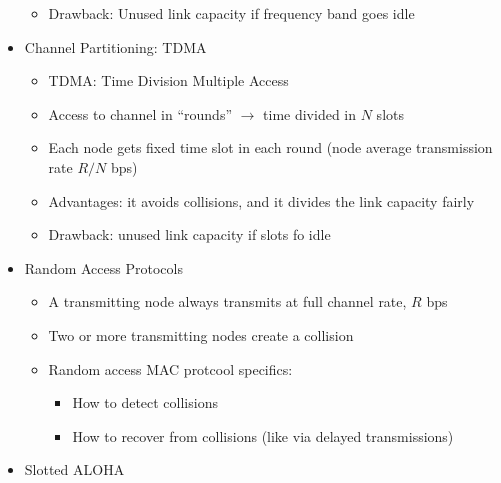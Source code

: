 \begin{itemize}
\begin{itemize}
      \item Drawback: Unused link capacity if frequency band goes idle

    \end{itemize}

  \item Channel Partitioning: TDMA

    \begin{itemize}

      \item TDMA: Time Division Multiple Access

      \item Access to channel in ``rounds'' $\to$ time divided in $N$ slots

      \item Each node gets fixed time slot in each round (node average transmission rate $R/N$ bps)

      \item Advantages: it avoids collisions, and it divides the link capacity fairly

      \item Drawback: unused link capacity if slots fo idle

    \end{itemize}

  \item Random Access Protocols

    \begin{itemize}

      \item A transmitting node always transmits at full channel rate, $R$ bps

      \item Two or more transmitting nodes create a collision

      \item Random access MAC protcool specifics:

        \begin{itemize}

          \item How to detect collisions

          \item How to recover from collisions (like via delayed transmissions)

        \end{itemize}

    \end{itemize}

  \item Slotted ALOHA


\end{itemize}
